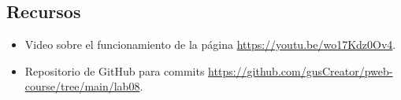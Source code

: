 \documentclass{article}
\begin{document}
  \subsection{Recursos}

  \begin{itemize}
    \item Video sobre el funcionamiento de la página \url{https://youtu.be/wo17Kdz0Ov4}.
    \item Repositorio de GitHub para commits \url{https://github.com/gusCreator/pweb-course/tree/main/lab08}.
  \end{itemize}

\clearpage
	
%
%
%
			
\end{document}
